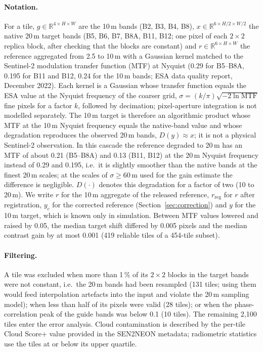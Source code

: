 \documentclass[pdflatex,sn-basic,referee,lineno]{sn-jnl}
\newcommand{\rreg}{r_{\mathrm{reg}}}
\begin{document}
\paragraph{Notation.} For a tile, $g\in\mathbb{R}^{4\times H\times W}$ are the 10\,m bands (B2, B3, B4, B8),
$x\in\mathbb{R}^{6\times H/2\times W/2}$ the native 20\,m target bands (B5, B6, B7, B8A, B11, B12; one pixel of
each $2\times2$ replica block, after checking that the blocks are constant) and $r\in\mathbb{R}^{6\times H\times W}$ the reference aggregated from 2.5 to 10\,m with a Gaussian
kernel matched to the Sentinel-2 modulation transfer function (MTF) at Nyquist (0.29 for B5--B8A, 0.195 for B11
and B12, 0.24 for the 10\,m bands; ESA data quality report, December 2022). Each kernel is a Gaussian whose transfer function equals
the ESA value at the Nyquist frequency of the coarser grid, $\sigma = (k/\pi)\sqrt{-2\ln\mathrm{MTF}}$ fine pixels
for a factor $k$, followed by decimation; pixel-aperture integration is not modelled separately. The 10\,m target
is therefore an algorithmic product whose MTF at the 10\,m Nyquist frequency equals the native-band value and whose
degradation reproduces the observed 20\,m bands, $D(y)\approx x$; it is not a physical Sentinel-2 observation. In
this cascade the reference degraded to 20\,m has an MTF of about 0.21 (B5--B8A) and 0.13 (B11, B12) at the 20\,m
Nyquist frequency instead of 0.29 and 0.195, i.e.\ it is slightly smoother than the native bands at the finest
20\,m scales; at the scales of $\sigma\ge60$\,m used for the gain estimate the difference is negligible. $D(\cdot)$
denotes this degradation for a factor of two (10 to 20\,m). We write $r$ for the 10\,m aggregate of the released
reference, $\rreg$ for $r$ after registration, $y_c$ for the corrected reference (Section~\ref{sec:correction}) and
$y$ for the 10\,m target, which is known only in simulation. Between MTF values lowered and raised by 0.05, the
median target shift differed by 0.005 pixels and the median contrast gain by at most 0.001 (419 reliable tiles of a
454-tile subset).

\paragraph{Filtering.} A tile was excluded when more than 1\,\% of its $2\times2$ blocks in the target bands were
not constant, i.e.\ the 20\,m bands had been resampled (131 tiles; using them would feed interpolation artefacts into the
input and violate the 20\,m sampling model); when less than half of its pixels were valid
(28 tiles); or when the phase-correlation peak of the guide bands was below 0.1 (10 tiles). The remaining 2,100
tiles enter the error analysis. Cloud contamination is described by the per-tile Cloud Score+ value provided in the
SEN2NEON metadata; radiometric statistics use the tiles at or below its upper quartile.
\end{document}
